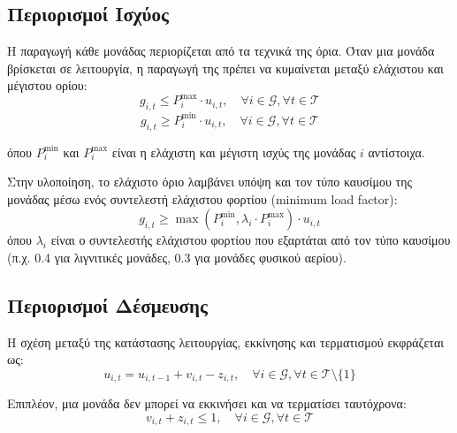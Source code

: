 \subsection{Περιορισμοί Ισχύος}
\label{subsec:uc-power-constraints}

Η παραγωγή κάθε μονάδας περιορίζεται από τα τεχνικά της όρια. Όταν μια μονάδα βρίσκεται σε λειτουργία, η παραγωγή της πρέπει να κυμαίνεται μεταξύ ελάχιστου και μέγιστου ορίου:
\begin{equation}
\label{eq:uc-capacity-upper}
g_{i,t} \leq P_i^{\max} \cdot u_{i,t}, \quad \forall i \in \mathcal{G}, \forall t \in \mathcal{T}
\end{equation}
\begin{equation}
\label{eq:uc-capacity-lower}
g_{i,t} \geq P_i^{\min} \cdot u_{i,t}, \quad \forall i \in \mathcal{G}, \forall t \in \mathcal{T}
\end{equation}

όπου $P_i^{\min}$ και $P_i^{\max}$ είναι η ελάχιστη και μέγιστη ισχύς της μονάδας $i$ αντίστοιχα.

Στην υλοποίηση, το ελάχιστο όριο λαμβάνει υπόψη και τον τύπο καυσίμου της μονάδας μέσω ενός συντελεστή ελάχιστου φορτίου (minimum load factor):
\begin{equation}
\label{eq:uc-min-fuel}
g_{i,t} \geq \max\left(P_i^{\min}, \lambda_i \cdot P_i^{\max}\right) \cdot u_{i,t}
\end{equation}
όπου $\lambda_i$ είναι ο συντελεστής ελάχιστου φορτίου που εξαρτάται από τον τύπο καυσίμου (π.χ. 0.4 για λιγνιτικές μονάδες, 0.3 για μονάδες φυσικού αερίου).

\subsection{Περιορισμοί Δέσμευσης}
\label{subsec:uc-commitment-constraints}

Η σχέση μεταξύ της κατάστασης λειτουργίας, εκκίνησης και τερματισμού εκφράζεται ως:
\begin{equation}
\label{eq:uc-commitment-link}
u_{i,t} = u_{i,t-1} + v_{i,t} - z_{i,t}, \quad \forall i \in \mathcal{G}, \forall t \in \mathcal{T} \setminus \{1\}
\end{equation}

Επιπλέον, μια μονάδα δεν μπορεί να εκκινήσει και να τερματίσει ταυτόχρονα:
\begin{equation}
\label{eq:uc-startup-shutdown-exclusive}
v_{i,t} + z_{i,t} \leq 1, \quad \forall i \in \mathcal{G}, \forall t \in \mathcal{T}
\end{equation}

